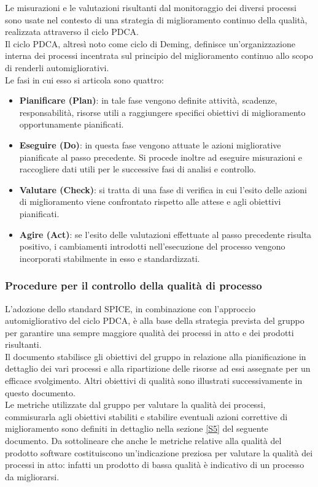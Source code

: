 	Le misurazioni e le valutazioni risultanti dal monitoraggio dei diversi processi sono usate nel contesto di una strategia di miglioramento continuo della qualità, realizzata attraverso il ciclo PDCA.
	\\Il ciclo PDCA, altresì noto come ciclo di Deming, definisce un'organizzazione interna dei processi incentrata sul principio del miglioramento continuo allo scopo di renderli automigliorativi.
	\\Le fasi in cui esso si articola sono quattro:
		\begin{itemize}
			\item \textbf{Pianificare (Plan)}: in tale fase vengono definite attività, scadenze, responsabilità, risorse utili a raggiungere specifici obiettivi di miglioramento opportunamente pianificati.
			\item \textbf{Eseguire (Do)}: in questa fase vengono attuate le azioni migliorative pianificate al passo precedente. Si procede inoltre ad eseguire misurazioni e raccogliere dati utili per le successive fasi di analisi e controllo.
			\item \textbf{Valutare (Check)}: si tratta di una fase di verifica in cui l'esito delle azioni di miglioramento viene confrontato rispetto alle attese e agli obiettivi pianificati.
			\item \textbf{Agire (Act)}: se l'esito delle valutazioni effettuate al passo precedente risulta positivo, i cambiamenti introdotti nell'esecuzione del processo vengono incorporati stabilmente in esso e standardizzati.
		\end{itemize}

		\subsubsection{Procedure per il controllo della qualità di processo}
		L'adozione dello standard SPICE, in combinazione con l'approccio automigliorativo del ciclo PDCA, è alla base della strategia prevista del gruppo per garantire una sempre maggiore qualità dei processi in atto e dei prodotti risultanti.
		\\Il documento \PdP{} stabilisce gli obiettivi del gruppo in relazione alla pianificazione in dettaglio dei vari processi e alla ripartizione delle risorse ad essi assegnate per un efficace svolgimento. Altri obiettivi di qualità sono illustrati successivamente in questo documento.
		\\Le metriche utilizzate dal gruppo per valutare la qualità dei processi, commisurarla agli obiettivi stabiliti e stabilire eventuali azioni correttive di miglioramento sono definiti in dettaglio nella sezione \ref{S5} del seguente documento. Da sottolineare che anche le metriche relative alla qualità del prodotto software costituiscono un'indicazione preziosa per valutare la qualità dei processi in atto: infatti un prodotto di bassa qualità è indicativo di un processo da migliorarsi.

